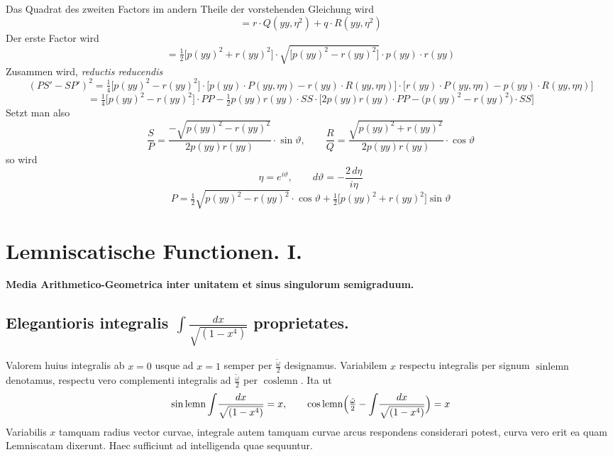 \documentclass[10pt,a4paper]{article}
\newcommand{\lemn}{\text{lemn}}
\newcommand{\sinlemn}{\sin\lemn}
\newcommand{\coslemn}{\cos\lemn}
\begin{document}
Das Quadrat des zweiten Factors im andern Theile der vorstehenden Gleichung wird
\[
= r\cdot Q(yy,\eta^2) + q\cdot R(yy,\eta^2)
\]
Der erste Factor wird
\[
= \tfrac12\bigl[p(yy)^2+r(yy)^2\bigr]\cdot\sqrt{\bigl[p(yy)^2-r(yy)^2\bigr]}\cdot p(yy)\cdot r(yy)
\]
Zusammen wird, \textit{reductis reducendis}
\[
(PS'-SP')^2 = \tfrac14\bigl[p(yy)^2-r(yy)^2\bigr]\cdot\bigl[p(yy)\cdot P(yy,\eta\eta)-r(yy)\cdot R(yy,\eta\eta)\bigr] \cdot \bigl[r(yy)\cdot P(yy,\eta\eta)-p(yy)\cdot R(yy,\eta\eta)\bigr]
\]
\[
= \tfrac14\bigl[p(yy)^2-r(yy)^2\bigr]\cdot PP - \tfrac12 p(yy)r(yy)\cdot SS \cdot \bigl[2p(yy)r(yy)\cdot PP - \bigl(p(yy)^2-r(yy)^2\bigr)\cdot SS\bigr]
\]
Setzt man also
\[
\frac{S}{P} = \frac{-\sqrt{p(yy)^2-r(yy)^2}}{2p(yy)r(yy)} \cdot \sin\vartheta, \qquad
\frac{R}{Q} = \frac{\sqrt{p(yy)^2+r(yy)^2}}{2p(yy)r(yy)} \cdot \cos\vartheta
\]
so wird
\[
\eta = e^{i\vartheta}, \qquad d\vartheta = -\frac{2\,d\eta}{i\eta}
\]
\[
P = \tfrac12\sqrt{p(yy)^2-r(yy)^2}\cdot\cos\vartheta + \tfrac12\bigl[p(yy)^2+r(yy)^2\bigr]\sin\vartheta
\]

\section*{Lemniscatische Functionen. I.}

\begin{center}
\textbf{Media Arithmetico-Geometrica inter unitatem et sinus singulorum semigraduum.}
\end{center}

\subsection*{Elegantioris integralis \texorpdfstring{$\int\!\frac{dx}{\sqrt{(1-x^4)}}$}{} proprietates.}

Valorem huius integralis ab $x=0$ usque ad $x=1$ semper per $\frac{\tilde{\omega}}{2}$ designamus. Variabilem $x$ respectu integralis per signum $\sinlemn$ denotamus, respectu vero complementi integralis ad $\frac{\tilde{\omega}}{2}$ per $\coslemn$. Ita ut
\[
\sinlemn\int\!\frac{dx}{\sqrt{(1-x^4)}} = x, \qquad
\coslemn\Bigl(\tfrac{\tilde{\omega}}{2}-\int\!\frac{dx}{\sqrt{(1-x^4)}}\Bigr) = x
\]
Variabilis $x$ tamquam radius vector curvae, integrale autem tamquam curvae arcus respondens considerari potest, curva vero erit ea quam Lemniscatam dixerunt. Haec sufficiunt ad intelligenda quae sequuntur.
\end{document}
